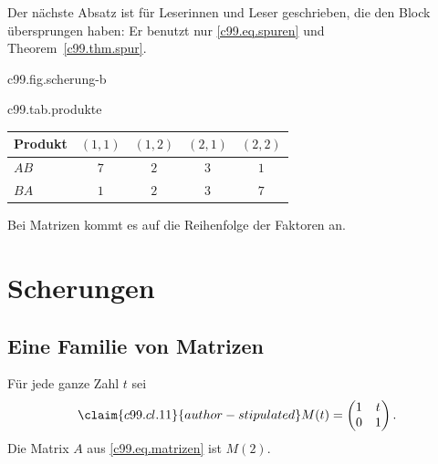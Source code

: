 Der nächste Absatz ist für Leserinnen und Leser geschrieben, die den Block
übersprungen haben: Er benutzt nur \eqref{c99.eq.spuren} und Theorem~\ref{c99.thm.spur}.

\begin{tpcfigure}{c99.fig.scherung-b}
  \caption{Die Matrix $B$ als Abbildung: $(x,y)$ geht auf $(x,\,3x+y)$. Zweites
    Bild mit Demo auf derselben Seite.}
\end{tpcfigure}

\begin{tpctable}{c99.tab.produkte}
  \caption{Die Einträge der beiden Produkte aus \eqref{c99.eq.ab} und \eqref{c99.eq.ba}.}
  \begin{tabular}{lcccc}
    \toprule
    Produkt & $(1,1)$ & $(1,2)$ & $(2,1)$ & $(2,2)$ \\
    \midrule
    $AB$ & $7$ & $2$ & $3$ & $1$ \\
    $BA$ & $1$ & $2$ & $3$ & $7$ \\
    \bottomrule
  \end{tabular}
\end{tpctable}

\begin{merksatz}[Merksatz]
  Bei Matrizen kommt es auf die Reihenfolge der Faktoren an.
\end{merksatz}

\section{Scherungen}\label{c99.s2}

\subsection{Eine Familie von Matrizen}\label{c99.s2.1}

Für jede ganze Zahl $t$ sei
\begin{equation}\label{c99.eq.scherung}\claim{c99.cl.11}{author-stipulated}
  M(t) = \begin{pmatrix} 1 & t \\ 0 & 1 \end{pmatrix}.
\end{equation}
Die Matrix $A$ aus \eqref{c99.eq.matrizen} ist $M(2)$.


